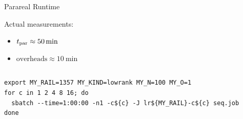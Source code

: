 \begin{frame}[b,fragile]{\secname}
\begin{columns}[c,onlytextwidth]
\begin{block}{Parareal Runtime}
\begin{itemize}
    \end{itemize}
    \medskip
    Actual measurements:
    \begin{itemize}
      \item
        $t_\text{par} \approx \SI{50}{\minute}$
      \item
        $\text{overheads} \approx \SI{10}{\minute}$
    \end{itemize}
  \end{block}
  \centering
  \hyperlink{runtime}{}
  \hyperlink{speedup<2>}{}
  \vspace*{-\baselineskip}
  \end{columns}
  \onslide
  \vfill
  \begin{lstlisting}
export MY_RAIL=1357 MY_KIND=lowrank MY_N=100 MY_O=1
for c in 1 2 4 8 16; do
  sbatch --time=1:00:00 -n1 -c${c} -J lr${MY_RAIL}-c${c} seq.job
done
  \end{lstlisting}
\end{frame}

